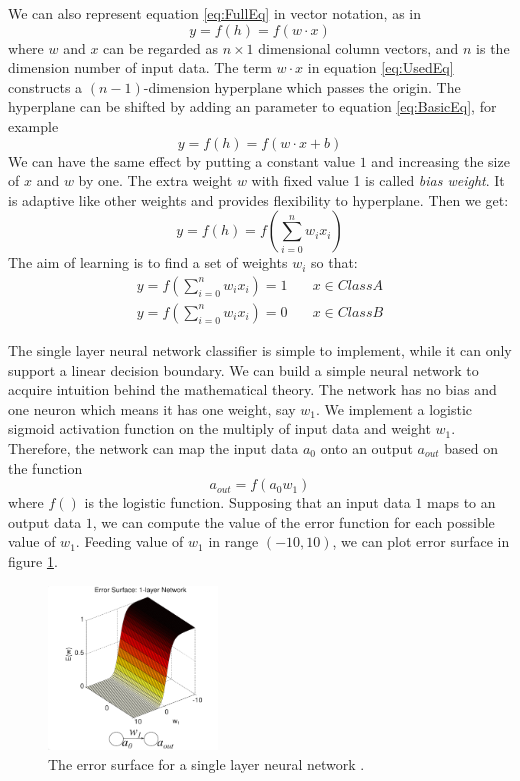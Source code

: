 We can also represent equation \ref{eq:FullEq} in vector notation, as in 
\begin{equation}\label{eq:UsedEq}
y = f(h) = f(w \cdot x)
\end{equation}
where $w$ and $x$ can be regarded as $n\times1$ dimensional column vectors, and $n$ is the dimension number of input data.
The term $w \cdot x$ in equation \ref{eq:UsedEq} constructs a $(n-1)$-dimension hyperplane which passes the origin. The hyperplane can be shifted by adding an parameter to equation \ref{eq:BasicEq}, for example
\begin{equation}\label{eq:WithBias}
y = f(h) = f(w \cdot x + b)
\end{equation}
We can have the same effect by putting a constant value $1$ and increasing the size of $x$ and $w$ by one. The extra weight $w$ with fixed value 1 is called \textit{bias weight}. It is adaptive like other weights and provides flexibility to hyperplane. Then we get:
\begin{equation}\label{eq:finalEq}
y = f(h) = f(\sum_{i=0}^{n}w_{i}x_{i})
\end{equation}
The aim of learning is to find a set of weights $w_{i}$ so that:
\begin{align*}
y = f(\sum_{i=0}^{n}w_{i}x_{i}) = 1  & \quad x \in Class A\\
y = f(\sum_{i=0}^{n}w_{i}x_{i}) = 0  & \quad x \in Class B
\end{align*}

The single layer neural network classifier is simple to implement, while it can only support a linear decision boundary. We can build a simple neural network to acquire intuition behind the mathematical theory. The network has no bias and one neuron which means it has one weight, say $w_{1}$. We implement a logistic sigmoid activation function on the multiply of input data and weight $w_{1}$. Therefore, the network can map the input data $a_0$ onto an output $a_{out}$ based on the function
\begin{equation}\label{eq:1LayerExample}
a_{out} = f(a_{0}w_{1})
\end{equation}
where $f()$ is the logistic function. Supposing that an input data $1$ maps to an output data $1$, we can compute the value of the error function for each possible value of $w_{1}$. Feeding value of $w_{1}$ in range $(-10,10)$, we can plot error surface in figure \ref{fig:1LayerErrorSurface}.
\graphicspath{ {./Figures/} }
\begin{figure}[!htb]
\centering
\includegraphics[width=0.4\textwidth]{1LayerErrorSurface.png}
\caption{\label{fig:1LayerErrorSurface}The error surface for a single layer neural network \citep{ErrorFigure1}.}
\end{figure}

